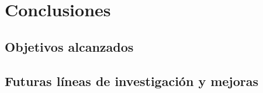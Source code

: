 \chapter{Conclusiones}

\section{Objetivos alcanzados}

\section{Futuras líneas de investigación y mejoras}